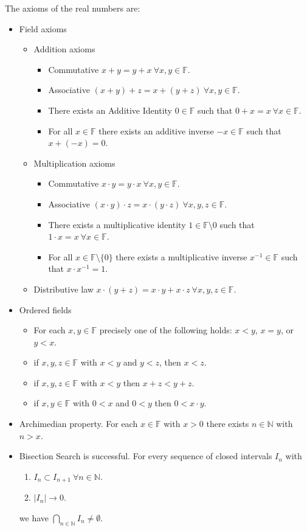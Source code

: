 \documentclass[12pt]{amsart}
\newcommand{\N}{\mathbb{N}}
\newcommand{\F}{\mathbb{F}}
\begin{document}
  The axioms of the real numbers are:
  \begin{itemize}
    \item Field axioms
      \begin{itemize}
        \item Addition axioms
          \begin{itemize}
            \item Commutative $x+y=y+x\ \forall x,y\in\F$.
            \item Associative $(x+y)+z=x+(y+z)\ \forall x,y\in\F$.
            \item There exists an Additive Identity $0\in\F$ such that
              $0+x=x\ \forall x\in\F$.
            \item For all $x\in\F$ there exists an additive inverse $-x\in\F$
              such that $x+(-x)=0$.
          \end{itemize}
        \item Multiplication axioms
          \begin{itemize}
            \item Commutative $x\cdot y=y\cdot x\ \forall x,y\in\F$.
            \item Associative $(x\cdot y)\cdot z = x\cdot(y\cdot z)\ \forall
              x,y,z\in\F$.
            \item There exists a multiplicative identity $1\in\F\setminus{0}$
              such that $1\cdot x=x\ \forall x\in\F$.
            \item For all $x\in\F\setminus\{0\}$ there exists a multiplicative
              inverse $x^{-1}\in\F$ such that $x\cdot x^{-1}=1$.
          \end{itemize}
        \item Distributive law $x\cdot(y+z)=x\cdot y+x\cdot z\ \forall
          x,y,z\in\F$.
      \end{itemize}
    \item Ordered fields
      \begin{itemize}
        \item For each $x,y\in\F$ precisely one of the following holds: $x<y$,
          $x=y$, or $y<x$.
        \item if $x,y,z\in\F$ with $x<y$ and $y<z$, then $x<z$.
        \item if $x,y,z\in\F$ with $x<y$ then $x+z<y+z$.
        \item if $x,y\in\F$ with $0<x$ and $0<y$ then $0<x\cdot y$.
      \end{itemize}
    \item Archimedian property. For each $x\in\F$ with $x>0$ there exists
      $n\in\N$ with $n>x$.
    \item Bisection Search is successful. For every sequence of closed intervals
      $I_n$ with
      \begin{enumerate}
        \item $I_n\subset I_{n+1}\ \forall n\in\N$.
        \item $|I_n|\to0$.
      \end{enumerate}
      we have $\bigcap_{n\in\N}I_n\neq\emptyset$.
  \end{itemize}
\end{document}

